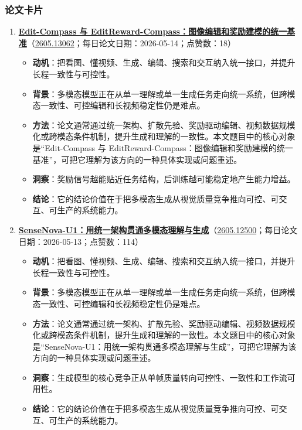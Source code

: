 \subsubsection{论文卡片}
\begin{enumerate}[leftmargin=1.5em]
  \item \textbf{\href{https://huggingface.co/papers/2605.13062}{Edit-Compass 与 EditReward-Compass：图像编辑和奖励建模的统一基准}}（\href{https://arxiv.org/abs/2605.13062}{2605.13062}；每日论文日期：2026-05-14；点赞数：18）
  \begin{itemize}[leftmargin=1.5em]
    \item \textbf{动机}：把看图、懂视频、生成、编辑、搜索和交互纳入统一接口，并提升长程一致性与可控性。
    \item \textbf{背景}：多模态模型正在从单一理解或单一生成任务走向统一系统，但跨模态一致性、可控编辑和长视频稳定性仍是难点。
    \item \textbf{方法}：论文通常通过统一架构、扩散先验、奖励驱动编辑、视频数据规模化或跨模态条件机制，提升生成和理解的一致性。本文题目中的核心对象是“Edit-Compass 与 EditReward-Compass：图像编辑和奖励建模的统一基准”，可把它理解为该方向的一种具体实现或问题重述。
    \item \textbf{洞察}：奖励信号越能贴近任务结构，后训练越可能稳定地产生能力增益。
    \item \textbf{结论}：它的结论价值在于把多模态生成从视觉质量竞争推向可控、可交互、可生产的系统能力。
  \end{itemize}
  \item \textbf{\href{https://huggingface.co/papers/2605.12500}{SenseNova-U1：用统一架构贯通多模态理解与生成}}（\href{https://arxiv.org/abs/2605.12500}{2605.12500}；每日论文日期：2026-05-13；点赞数：114）
  \begin{itemize}[leftmargin=1.5em]
    \item \textbf{动机}：把看图、懂视频、生成、编辑、搜索和交互纳入统一接口，并提升长程一致性与可控性。
    \item \textbf{背景}：多模态模型正在从单一理解或单一生成任务走向统一系统，但跨模态一致性、可控编辑和长视频稳定性仍是难点。
    \item \textbf{方法}：论文通常通过统一架构、扩散先验、奖励驱动编辑、视频数据规模化或跨模态条件机制，提升生成和理解的一致性。本文题目中的核心对象是“SenseNova-U1：用统一架构贯通多模态理解与生成”，可把它理解为该方向的一种具体实现或问题重述。
    \item \textbf{洞察}：生成模型的核心竞争正从单帧质量转向可控性、一致性和工作流可用性。
    \item \textbf{结论}：它的结论价值在于把多模态生成从视觉质量竞争推向可控、可交互、可生产的系统能力。

\end{itemize}
\end{enumerate}
